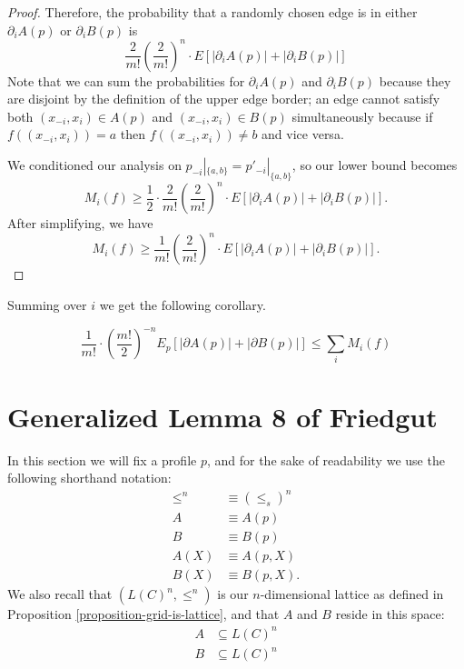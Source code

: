 \begin{proof}
		Therefore, the probability that a randomly chosen edge is in either $\partial_i A(p)$ or $\partial_i B(p)$ is
		\[
			\frac{2}{m!} \left(\frac{2}{m!}\right)^{n} \cdot E \left[ |\partial_i A(p)| + |\partial_i B(p)| \right]
		\]
		Note that we can sum the probabilities for $\partial_i A(p)$ and $\partial_i B(p)$ because they are disjoint by the definition of the upper edge border; an edge cannot satisfy both $(x_{-i}, x_i) \in A(p)$ and $(x_{-i}, x_i) \in B(p)$ simultaneously because if $f((x_{-i}, x_i)) = a$ then $f((x_{-i}, x_i)) \ne b$ and vice versa.

		We conditioned our analysis on $p_{-i}|_{\{a,b\}} = p'_{-i}|_{\{a,b\}}$, so our lower bound becomes
		\[
			M_i(f) \ge \frac{1}{2} \cdot \frac{2}{m!}\left(\frac{2}{m!}\right)^{n} \cdot E \left[ |\partial_i A(p)| + |\partial_i B(p)| \right].
		\]
		After simplifying, we have
		\[
			M_i(f) \ge \frac{1}{m!}\left(\frac{2}{m!}\right)^{n} \cdot E \left[ |\partial_i A(p)| + |\partial_i B(p)| \right].
		\]
	\end{proof}

	Summing over $i$ we get the following corollary.

	\begin{corollary}
		\[
			\frac{1}{m!} \cdot \left(\frac{m!}{2}\right)^{-n} E_p[|\partial A(p)| + |\partial B(p)|] \le \sum_i M_i(f)
		\]
	\end{corollary}


\section{Generalized Lemma 8 of Friedgut}

	In this section we will fix a profile $p$, and for the sake of readability we use the following shorthand notation:
	\begin{align*}
		\le^n &\equiv (\le_s)^n \\
		A &\equiv A(p) \\
		B &\equiv B(p) \\
		A(X) &\equiv A(p, X) \\
		B(X) &\equiv B(p, X).
	\end{align*}
	We also recall that $(L(C)^n, \le^n)$ is our $n$-dimensional lattice as defined in Proposition \ref{proposition-grid-is-lattice}, and that $A$ and $B$ reside in this space:
	\begin{align*}
		A &\subseteq L(C)^n \\
		B &\subseteq L(C)^n \\
	\end{align*}

